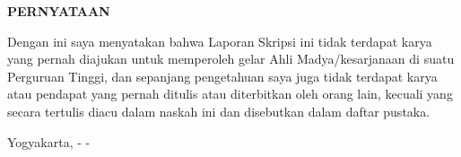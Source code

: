 {}
\doublespacing
\begin{center}
	\textbf{PERNYATAAN}
\end{center}
\vspace{\baselineskip}

Dengan ini saya menyatakan bahwa Laporan Skripsi ini tidak terdapat karya yang
pernah diajukan untuk memperoleh gelar Ahli Madya/kesarjanaan di suatu Perguruan Tinggi, dan sepanjang pengetahuan saya juga tidak terdapat karya atau pendapat yang pernah ditulis atau diterbitkan oleh orang lain, kecuali yang secara tertulis diacu dalam naskah ini dan disebutkan dalam daftar pustaka.

\begin{flushright}
Yogyakarta, \hspace{20pt} -\hspace{20pt} - \the\year{}

\vspace{3\baselineskip}

\nama
\end{flushright}
\singlespacing